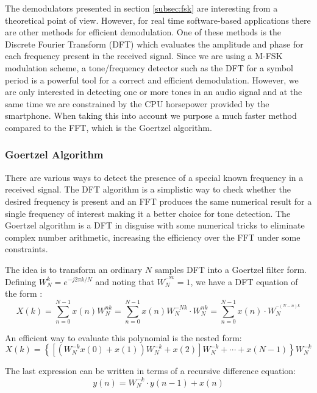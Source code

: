 \documentclass[12pt,a4paper,openright]{report}
\begin{document}
The demodulators presented in section \ref{subsec:fsk} are interesting from a theoretical point of view. However, for real time software-based applications there are other methods for efficient demodulation. One of these methods is the Discrete Fourier Transform (DFT) which evaluates the amplitude and phase for each frequency present in the received signal. Since we are using a M-FSK modulation scheme, a tone/frequency detector such as the DFT for a symbol period is a powerful tool for a correct and efficient demodulation. However, we are only interested in detecting one or more tones in an audio signal and at the same time we are constrained by the CPU horsepower provided by the smartphone. When taking this into account we purpose a much faster method compared to the FFT, which is the Goertzel algorithm. 


\subsubsection{Goertzel Algorithm}
\label{sec:FSKdemod}

There are various ways to detect the presence of a special known frequency in a received signal. The DFT algorithm is a simplistic way to check whether the desired frequency is present and an FFT produces the same numerical result for a single frequency of interest making it a better choice for tone detection. The Goertzel algorithm is a DFT in disguise with some numerical tricks to eliminate complex number arithmetic, increasing the efficiency over the FFT under some constraints.

The idea is to transform an ordinary $N$ samples DFT into a Goertzel filter form. Defining $W_N^{k}={e^{ - j2\pi k/N}}$ and noting that $W_N^{^{ - Nk}} = 1$, we have a DFT equation of the form \cite{GoertzelPaper}:
\begin{equation}
X(k) = \sum\limits_{n = 0}^{N - 1} {x(n)W_N^{nk}}  = \sum\limits_{n = 0}^{N - 1} {x(n)W_N^{ - Nk} \cdot W_N^{nk}}  = \sum\limits_{n = 0}^{N - 1} {x(n) \cdot W_N^{^{ - (N - n)k}}} 
\end{equation}

An efficient way to evaluate this polynomial is the nested form:
\begin{equation}
X(k) = \left\{ {\left[ {\left( {W_N^{ - k}x(0) + x(1)} \right)W_N^{ - k} + x(2)} \right]W_N^{ - k} +  \cdots  + x(N - 1)} \right\}W_N^{ - k}
\end{equation}

The last expression can be written in terms of a recursive difference equation:
\begin{equation}
y(n) = {W^{ - k}_N}\cdot y(n - 1) + x(n)
\end{equation}
\end{document}
